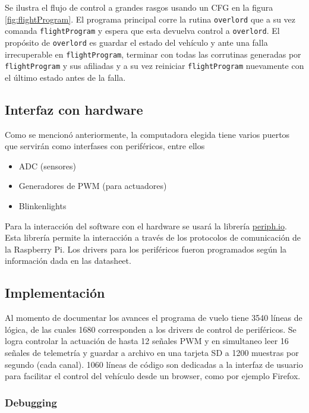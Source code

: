 Se ilustra el flujo de control a grandes rasgos usando un CFG en la figura \ref{fig:flightProgram}. El programa principal corre la rutina \texttt{overlord} que a su vez comanda \texttt{flightProgram} y espera que esta devuelva control a \texttt{overlord}. El propósito de \texttt{overlord} es guardar el estado del vehículo y ante una falla irrecuperable en \texttt{flightProgram}, terminar con todas las corrutinas generadas por \texttt{flightProgram} y sus afiliadas y a su vez reiniciar \texttt{flightProgram} nuevamente con el último estado antes de la falla.


\subsection{Interfaz con hardware}

Como se mencionó anteriormente, la computadora elegida tiene varios puertos que servirán como interfases con periféricos, entre ellos 

\begin{itemize}
    \item ADC (sensores)
    \item Generadores de PWM (para actuadores)
    \item Blinkenlights
\end{itemize}

Para la interacción del software con el hardware se usará la librería \href{https://periph.io}{periph.io}. Esta librería permite la interacción a través de los protocolos de comunicación de la Raspberry Pi. Los drivers para los periféricos fueron programados según la información dada en las datasheet.


\subsection{Implementación}

Al momento de documentar los avances el programa de vuelo tiene 3540 líneas de lógica, de las cuales 1680 corresponden a los drivers de control de periféricos. Se logra controlar la actuación de hasta 12 señales PWM y en simultaneo leer 16 señales de telemetría y guardar a archivo en una tarjeta SD a 1200 muestras por segundo (cada canal). 1060 líneas de código son dedicadas a la interfaz de usuario para facilitar el control del vehículo desde un browser, como por ejemplo Firefox.

\subsubsection{Debugging}

